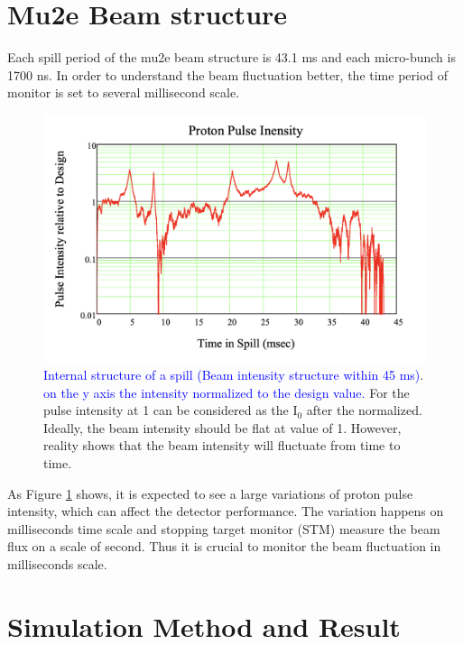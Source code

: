\documentclass[12pt]{extarticle}
\begin{document}
\section{Mu2e Beam structure}
Each spill period of the mu2e beam structure is 43.1 ms \cite{Mu2e_proposal} and each micro-bunch is 1700 ns. In order to understand the beam fluctuation better, the time period of monitor is set to several millisecond scale.
\begin{figure}[H]
\centering
\includegraphics[width=0.8\columnwidth]{figure/Beam intensity.png}
\caption{\textcolor{blue}{\cite{Mu2e_spill} Internal structure of a spill (Beam intensity structure within 45 ms)}. \textcolor{blue}{on the y axis the intensity normalized to the design value.}  For the pulse intensity at 1 can be considered as the I$_0$ after the normalized. Ideally, the beam intensity should be flat at value of 1. However, reality shows that the beam intensity will fluctuate from time to time.}
\label{Bema_intensity}
\end{figure}

\noindent As Figure \ref{Bema_intensity} shows, it is expected to see a large variations of proton pulse intensity, which can affect the detector performance. The variation happens on milliseconds time scale and stopping target monitor (STM) measure the beam flux on a scale of second. Thus it is crucial to monitor the beam fluctuation in milliseconds scale.

\section{Simulation Method and Result}
\end{document}

